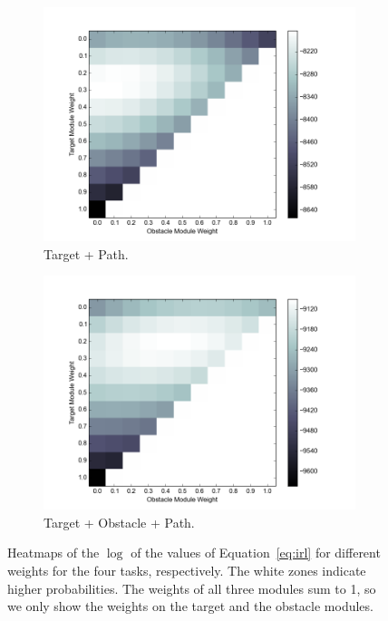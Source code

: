 \begin{figure}[h]
\begin{subfigure}[b]{0.4\textwidth}
\includegraphics[width=\textwidth]{objValuesTask3.png}
\caption{Target + Path. }
\end{subfigure}
\begin{subfigure}[b]{0.4\textwidth}
\includegraphics[width=\textwidth]{objValuesTask4.png}
\caption{Target + Obstacle + Path. }
\end{subfigure}
\caption{Heatmaps of the $\log$ of the values of Equation~\ref{eq:irl} for
different weights for the four tasks, respectively. The white zones indicate
higher probabilities. The weights of all three modules sum to 1, so we only show
the weights on the target and the obstacle modules.
}
\label{fig:heatmap}
\end{figure}

